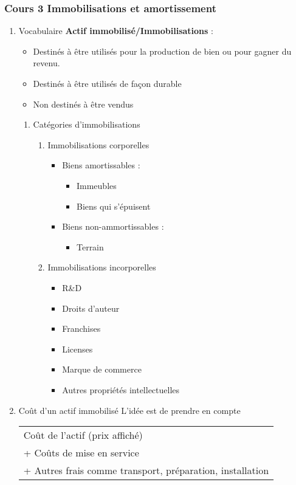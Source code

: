 \documentclass[11pt]{article}
\begin{document}
\subsubsection{Cours 3 Immobilisations et amortissement}
\label{sec:orga7e4d41}
\begin{enumerate}
\item Vocabulaire
\label{sec:orgcc96679}
\textbf{Actif immobilisé/Immobilisations} : 
\begin{itemize}
\item Destinés à être utilisés pour la production de bien ou pour gagner du revenu.
\item Destinés à être utilisés de façon durable
\item Non destinés à être vendus
\end{itemize}
\begin{enumerate}
\item Catégories d'immobilisations
\label{sec:org7bab5cd}
\begin{enumerate}
\item Immobilisations corporelles
\label{sec:orgb7cdb30}
\begin{itemize}
\item Biens amortissables : 
\begin{itemize}
\item Immeubles
\item Biens qui s'épuisent
\end{itemize}
\item Biens non-ammortissables : 
\begin{itemize}
\item Terrain
\end{itemize}
\end{itemize}
\item Immobilisations incorporelles
\label{sec:org348ac16}
\begin{itemize}
\item R\&D
\item Droits d'auteur
\item Franchises
\item Licenses
\item Marque de commerce
\item Autres propriétés intellectuelles
\end{itemize}
\end{enumerate}
\end{enumerate}

\item Coût d'un actif immobilisé
\label{sec:org79531bf}
L'idée est de prendre en compte 
\begin{center}
\begin{tabular}{l}
Coût de l'actif (prix affiché)\\
+ Coûts de mise en service\\
+ Autres frais comme transport, préparation, installation\\
\end{tabular}
\end{center}



\end{enumerate}
\end{document}
